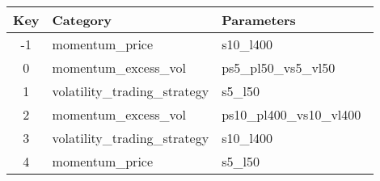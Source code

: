 \begin{tabular}{c|ll}

Key & Category & Parameters \\
\hline
-1 & momentum\_price&s10\_l400\ \\
0 & momentum\_excess\_vol&ps5\_pl50\_vs5\_vl50\ \\
1 & volatility\_trading\_strategy&s5\_l50\ \\
2 & momentum\_excess\_vol&ps10\_pl400\_vs10\_vl400\ \\
3 & volatility\_trading\_strategy&s10\_l400\ \\
4 & momentum\_price&s5\_l50\ \\

\end{tabular}